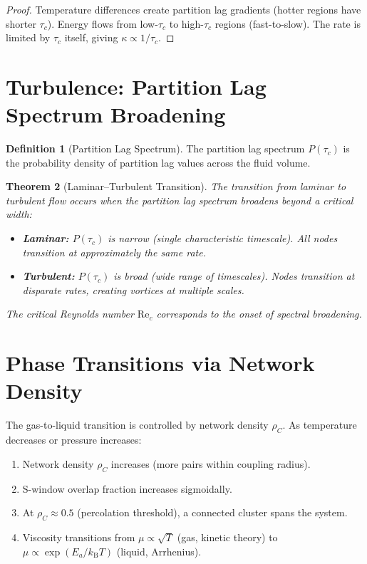 \documentclass[twocolumn,10pt,a4paper]{article}
\theoremstyle{plain}
\newtheorem{theorem}{Theorem}[section]
\theoremstyle{definition}
\newtheorem{definition}[theorem]{Definition}
\theoremstyle{remark}
\newcommand{\kB}{k_{\mathrm{B}}}
\newcommand{\tauc}{\tau_c}
\begin{document}
\begin{proof}
Temperature differences create partition lag gradients (hotter regions have shorter $\tauc$). Energy flows from low-$\tauc$ to high-$\tauc$ regions (fast-to-slow). The rate is limited by $\tauc$ itself, giving $\kappa \propto 1/\tauc$.
\end{proof}

\section{Turbulence: Partition Lag Spectrum Broadening}
\label{sec:turbulence}

\begin{definition}[Partition Lag Spectrum]
\label{def:lag_spectrum}
The partition lag spectrum $P(\tauc)$ is the probability density of partition lag values across the fluid volume.
\end{definition}

\begin{theorem}[Laminar--Turbulent Transition]
\label{thm:turbulence}
The transition from laminar to turbulent flow occurs when the partition lag spectrum broadens beyond a critical width:
\begin{itemize}
    \item \textbf{Laminar:} $P(\tauc)$ is narrow (single characteristic timescale). All nodes transition at approximately the same rate.
    \item \textbf{Turbulent:} $P(\tauc)$ is broad (wide range of timescales). Nodes transition at disparate rates, creating vortices at multiple scales.
\end{itemize}
The critical Reynolds number $\mathrm{Re}_c$ corresponds to the onset of spectral broadening.
\end{theorem}

\section{Phase Transitions via Network Density}
\label{sec:phase_transition}

The gas-to-liquid transition is controlled by network density $\rho_C$. As temperature decreases or pressure increases:
\begin{enumerate}
    \item Network density $\rho_C$ increases (more pairs within coupling radius).
    \item S-window overlap fraction increases sigmoidally.
    \item At $\rho_C \approx 0.5$ (percolation threshold), a connected cluster spans the system.
    \item Viscosity transitions from $\mu \propto \sqrt{T}$ (gas, kinetic theory) to $\mu \propto \exp(E_a/\kB T)$ (liquid, Arrhenius).
\end{enumerate}
\end{document}
